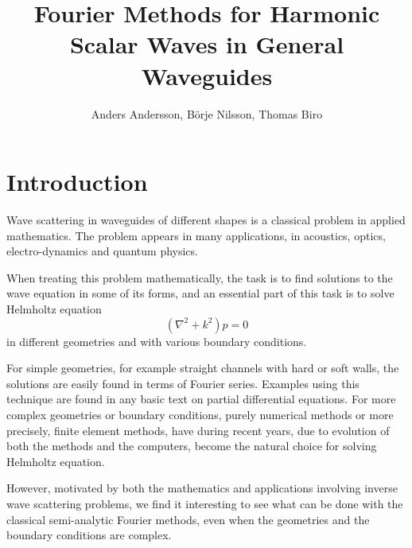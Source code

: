 \documentclass[a4paper,11pt]{article}
\begin{document}
\title{Fourier Methods for Harmonic Scalar Waves in General
  Waveguides}

\author{Anders Andersson, B\"orje Nilsson, Thomas Biro}
\maketitle

\section{Introduction}
\label{sec:intro}

Wave scattering in waveguides of different shapes is a classical
problem in applied mathematics. The problem appears in many
applications, in acoustics, optics, electro-dynamics and quantum
physics.

When treating this problem mathematically, the task is to find
solutions to the wave equation in some of its forms, and an essential
part of this task is to solve Helmholtz equation
\begin{equation}
  \label{eq:Helmholtz1}
  (\nabla^2+k^2)p=0
\end{equation}
in different geometries and with various boundary conditions.

For simple geometries, for example straight channels with hard or soft
walls, the solutions are easily found in terms of Fourier
series. Examples using this technique are found in any basic text on
partial differential equations. For more complex geometries or
boundary conditions, purely numerical methods or more precisely, finite
element methods, have during recent years, due to evolution of both
the methods and the computers, become the natural choice for solving
Helmholtz equation.


However, motivated by both the mathematics and applications involving
inverse wave scattering problems, we find it interesting to see what
can be done with the classical semi-analytic Fourier methods, even
when the geometries and the boundary conditions are complex.
\end{document}
